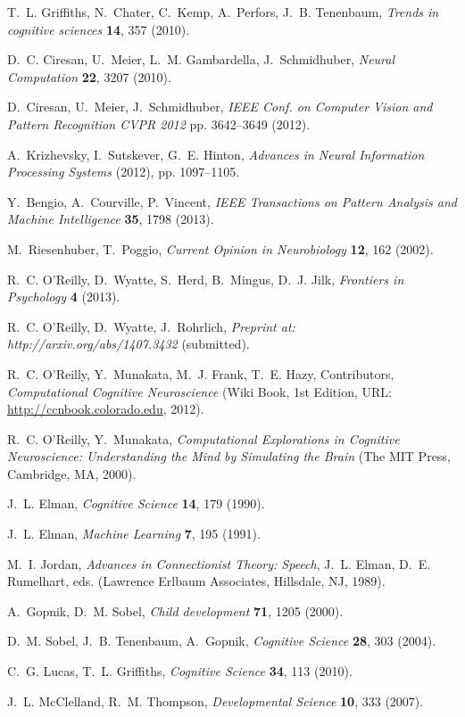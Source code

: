 \documentclass[11pt,twoside]{article}
\newif\myifpdf
\begin{document}
\begin{thebibliography}{10}

T.~L. Griffiths, N.~Chater, C.~Kemp, A.~Perfors, J.~B. Tenenbaum, {\it Trends
  in cognitive sciences\/} {\bf 14}, 357 (2010).

D.~C. Ciresan, U.~Meier, L.~M. Gambardella, J.~Schmidhuber, {\it Neural
  Computation\/} {\bf 22}, 3207 (2010).

D.~Ciresan, U.~Meier, J.~Schmidhuber, {\it IEEE Conf. on Computer Vision and
  Pattern Recognition CVPR 2012\/} pp. 3642--3649 (2012).

A.~Krizhevsky, I.~Sutskever, G.~E. Hinton, {\it Advances in Neural Information
  Processing Systems\/} (2012), pp. 1097--1105.

Y.~Bengio, A.~Courville, P.~Vincent, {\it IEEE Transactions on Pattern Analysis
  and Machine Intelligence\/} {\bf 35}, 1798 (2013).

M.~Riesenhuber, T.~Poggio, {\it Current Opinion in Neurobiology\/} {\bf 12},
  162 (2002).

R.~C. O'Reilly, D.~Wyatte, S.~Herd, B.~Mingus, D.~J. Jilk, {\it Frontiers in
  Psychology\/} {\bf 4} (2013).

R.~C. O'Reilly, D.~Wyatte, J.~Rohrlich, {\it Preprint at:
  http://arxiv.org/abs/1407.3432\/}  (submitted).

R.~C. O'Reilly, Y.~Munakata, M.~J. Frank, T.~E. Hazy, Contributors, {\it
  {Computational Cognitive Neuroscience}\/} (Wiki Book, 1st Edition, URL:
  \url{http://ccnbook.colorado.edu}, 2012).

R.~C. O'Reilly, Y.~Munakata, {\it {Computational Explorations in Cognitive
  Neuroscience}: {Understanding the Mind by Simulating the Brain}\/} (The MIT
  Press, Cambridge, MA, 2000).

J.~L. Elman, {\it Cognitive Science\/} {\bf 14}, 179 (1990).

J.~L. Elman, {\it Machine Learning\/} {\bf 7}, 195 (1991).

M.~I. Jordan, {\it Advances in Connectionist Theory: Speech\/}, J.~L. Elman,
  D.~E. Rumelhart, eds. (Lawrence Erlbaum Associates, Hillsdale, NJ, 1989).

A.~Gopnik, D.~M. Sobel, {\it Child development\/} {\bf 71}, 1205 (2000).

D.~M. Sobel, J.~B. Tenenbaum, A.~Gopnik, {\it Cognitive Science\/} {\bf 28},
  303 (2004).

C.~G. Lucas, T.~L. Griffiths, {\it Cognitive Science\/} {\bf 34}, 113 (2010).

J.~L. McClelland, R.~M. Thompson, {\it Developmental Science\/} {\bf 10}, 333
  (2007).

\end{thebibliography}
\end{document}
